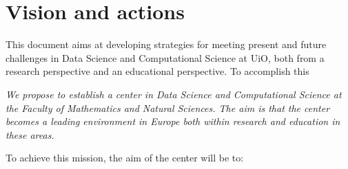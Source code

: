 \documentclass[a4paper,10pt]{article}
\begin{document}




\section{Vision and actions}

This document aims at developing strategies for meeting  present and future challenges in Data Science  and Computational Science at UiO, both from a research perspective and an educational perspective. To accomplish this\newline

{\em We propose to establish a center in  Data Science and Computational Science at the Faculty of Mathematics and Natural Sciences. The aim is that the center becomes a leading environment  in Europe both within research and education in these areas.}
\vspace*{.5cm}

\noindent
To achieve this mission, the aim of the center will be to:
\end{document}
